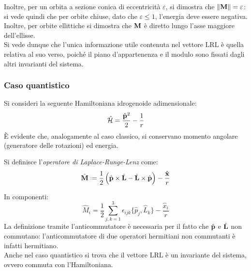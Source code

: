 Inoltre, per un orbita a sezione conica di eccentricità $ \varepsilon $, si dimostra che $ \left\lVert\mathbf{M}\right\rVert = \varepsilon $: si vede quindi che per orbite chiuse, dato che $ \varepsilon \le 1 $, l'energia deve essere negativa. Inoltre, per orbite ellittiche si dimostra che $ \mathbf{M} $ è diretto lungo l'asse maggiore dell'ellisse.\\
Si vede dunque che l'unica informazione utile contenuta nel vettore LRL è quella relativa al suo verso, poiché il piano d'appartenenza e il modulo sono fissati dagli altri invarianti del sistema.

\subsubsection{Caso quantistico}

Si consideri la seguente Hamiltoniana idrogenoide adimensionale:
\begin{equation}
	\hat{\mathcal{H}} = \frac{\hat{\mathbf{p}}^2}{2} - \frac{1}{r}
	\label{eq:3.52}
\end{equation}
È evidente che, analogamente al caso classico, si conservano momento angolare (generatore delle rotazioni) ed energia.
\begin{definition}
	Si definisce l'\textit{operatore di Laplace-Runge-Lenz} come:
	\begin{equation}
		\hat{\ve{M}} \defeq \frac{1}{2} \left( \hat{\ve{p}} \times \hat{\ve{L}} - \hat{\ve{L}} \times \hat{\ve{p}} \right) - \frac{\hat{\ve{x}}}{r}
		\label{eq:3.53}
	\end{equation}
\end{definition}
In componenti:
\begin{equation}
	\hat{M}_i = \frac{1}{2} \sum_{j,k = 1}^{3} \epsilon_{ijk} \{\hat{p}_j,\hat{L}_k\} - \frac{\hat{x}_i}{r}
	\label{eq:3.54}
\end{equation}
La definizione tramite l'anticommutatore è necessaria per il fatto che $ \hat{\mathbf{p}} $ e $ \hat{\mathbf{L}} $ non commutano: l'anticommutatore di due operatori hermitiani non commutanti è infatti hermitiano.\\
Anche nel caso quantistico si trova che il vettore LRL è un invariante del sistema, ovvero commuta con l'Hamiltoniana.

